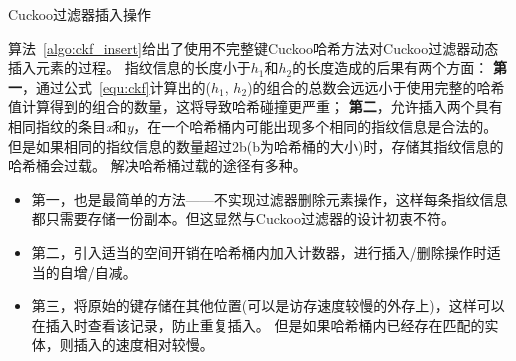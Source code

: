 \begin{algorithm}[htbp]
\SetAlgoLined
{}
\caption{Cuckoo过滤器插入操作}
\label{algo:ckf_insert}
\end{algorithm}

算法~\ref{algo:ckf_insert}给出了使用不完整键Cuckoo哈希方法对Cuckoo过滤器动态插入元素的过程。
指纹信息的长度小于$h_1$和$h_2$的长度造成的后果有两个方面：
\textbf{第一}，通过公式~\ref{equ:ckf}计算出的($h_1$, $h_2$)的组合的总数会远远小于使用完整的哈希值计算得到的组合的数量，这将导致哈希碰撞更严重；
\textbf{第二}，允许插入两个具有相同指纹的条目\textit{x}和\textit{y}，在一个哈希桶内可能出现多个相同的指纹信息是合法的。
但是如果相同的指纹信息的数量超过2b(b为哈希桶的大小)时，存储其指纹信息的哈希桶会过载。
解决哈希桶过载的途径有多种。
\begin{itemize}
	\item 第一，也是最简单的方法——不实现过滤器删除元素操作，这样每条指纹信息都只需要存储一份副本。但这显然与Cuckoo过滤器的设计初衷不符。
	\item 第二，引入适当的空间开销在哈希桶内加入计数器，进行插入/删除操作时适当的自增/自减。
	\item 第三，将原始的键存储在其他位置(可以是访存速度较慢的外存上)，这样可以在插入时查看该记录，防止重复插入。
	但是如果哈希桶内已经存在匹配的实体，则插入的速度相对较慢。
\end{itemize}	

